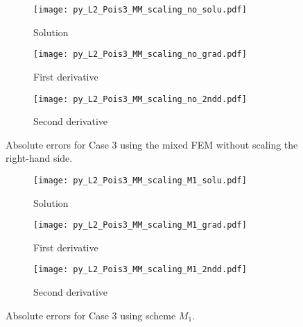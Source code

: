 \documentclass[review,3p]{elsarticle}
\begin{document}
\begin{figure}[!ht]
    \begin{subfigure}{5.5cm}
        \texttt{[image: py\_L2\_Pois3\_MM\_scaling\_no\_solu.pdf]}
        \caption{Solution}
        \label{py_L2_Pois3_MM_scaling_no_solu}
    \end{subfigure}
    \hspace{-0.2cm}
    \begin{subfigure}{5.5cm}
        \texttt{[image: py\_L2\_Pois3\_MM\_scaling\_no\_grad.pdf]}
        \caption{First derivative}
        \label{py_L2_Pois3_MM_scaling_no_grad}
    \end{subfigure}
    \hspace{-0.2cm}
    \begin{subfigure}{5.5cm}
        \texttt{[image: py\_L2\_Pois3\_MM\_scaling\_no\_2ndd.pdf]}
        \caption{Second derivative}
        \label{py_L2_Pois3_MM_scaling_no_2ndd}
    \end{subfigure}
\caption{Absolute errors for Case 3 using the mixed FEM without scaling the right-hand side.}
\label{py_L2_Pois3_MM_scaling_no}
\end{figure}

\begin{figure}[!ht]
    \begin{subfigure}{5.5cm}
        \texttt{[image: py\_L2\_Pois3\_MM\_scaling\_M1\_solu.pdf]}
        \caption{Solution}
        \label{py_L2_Pois3_MM_scaling_M1_solu}
    \end{subfigure}
    \hspace{-0.2cm}
    \begin{subfigure}{5.5cm}
        \texttt{[image: py\_L2\_Pois3\_MM\_scaling\_M1\_grad.pdf]}
        \caption{First derivative}
        \label{py_L2_Pois3_MM_scaling_M1_grad}
    \end{subfigure}
    \hspace{-0.2cm}
    \begin{subfigure}{5.5cm}
        \texttt{[image: py\_L2\_Pois3\_MM\_scaling\_M1\_2ndd.pdf]}
        \caption{Second derivative}
        \label{py_L2_Pois3_MM_scaling_M1_2ndd}
    \end{subfigure}
\caption{Absolute errors for Case 3 using scheme $M_1$.}
\label{py_L2_Pois3_MM_scaling_M1}
\end{figure}
\end{document}
